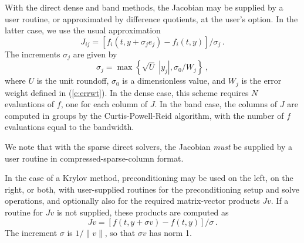 With the direct dense and band methods, the Jacobian may be supplied
by a user routine, or approximated by difference quotients,
at the user's option.  In the latter case, we use the usual
approximation
\[ J_{ij} = [f_i(t,y+\sigma_j e_j) - f_i(t,y)]/\sigma_j \, . \]
The increments $\sigma_j$ are given by
\[ \sigma_j = \max\left\{\sqrt{U} \; |y_j| , \sigma_0/W_j \right\} \, , \]
where $U$ is the unit roundoff, $\sigma_0$ is a dimensionless value,
and $W_j$ is the error weight defined in (\ref{e:errwt}).  In the dense
case, this scheme requires $N$ evaluations of $f$, one for each column
of $J$.  In the band case, the columns of $J$ are computed in groups
by the Curtis-Powell-Reid algorithm, with the number of $f$ evaluations
equal to the bandwidth.

We note that with the sparse direct solvers, the Jacobian {\em must}
be supplied by a user routine in compressed-sparse-column format.

In the case of a Krylov method, preconditioning may be used on the left, on
the right, or both, with user-supplied routines for the preconditioning
setup and solve operations, and optionally also for the required
matrix-vector products $Jv$.  If a routine for $Jv$ is not supplied,
these products are computed as
\begin{equation}\label{jacobv}
Jv = [f(t,y+\sigma v) - f(t,y)]/\sigma \, . 
\end{equation}
The increment $\sigma$ is $1/\|v\|$, so that $\sigma v$ has norm 1.

